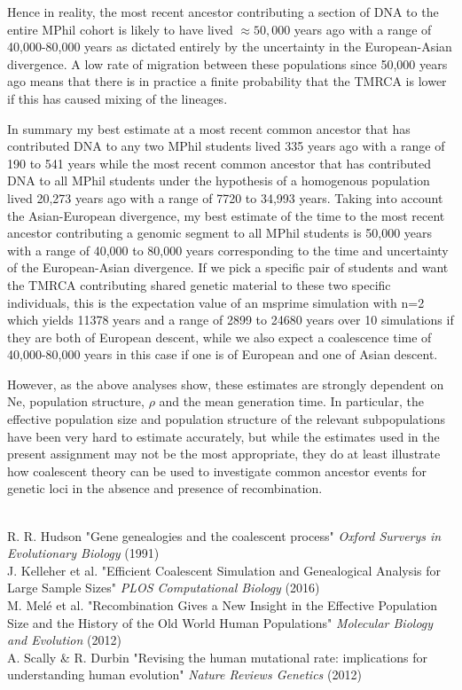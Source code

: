 \documentclass{article}
\begin{document}
Hence in reality, the most recent ancestor contributing a section of DNA to the entire MPhil cohort is likely to have lived $\approx 50,000$ years ago with a range of 40,000-80,000 years as dictated entirely by the uncertainty in the European-Asian divergence. A low rate of migration between these populations since 50,000 years ago means that there is in practice a finite probability that the TMRCA is lower if this has caused mixing of the lineages.

In summary my best estimate at a most recent common ancestor that has contributed DNA to any two MPhil students lived 335 years ago with a range of 190 to 541 years while the most recent common ancestor that has contributed DNA to all MPhil students under the hypothesis of a homogenous population lived 20,273 years ago with a range of 7720 to 34,993 years. Taking into account the Asian-European divergence, my best estimate of the time to the most recent ancestor contributing a genomic segment to all MPhil students is 50,000 years with a range of 40,000 to 80,000 years corresponding to the time and uncertainty of the European-Asian divergence. If we pick a specific pair of students and want the TMRCA contributing shared genetic material to these two specific individuals, this is the expectation value of an msprime simulation with n=2 which yields 11378 years and a range of 2899 to 24680 years over 10 simulations if they are both of European descent, while we also expect a coalescence time of 40,000-80,000 years in this case if one is of European and one of Asian descent.


However, as the above analyses show, these estimates are strongly dependent on Ne, population structure, $\rho$ and the mean generation time. In particular, the effective population size and population structure of the relevant subpopulations have been very hard to estimate accurately, but while the estimates used in the present assignment may not be the most appropriate, they do at least illustrate how coalescent theory can be used to investigate common ancestor events for genetic loci in the absence and presence of recombination.

~\\

R. R. Hudson "Gene genealogies and the coalescent process" \textit{Oxford Surverys in Evolutionary Biology} (1991)\\
J. Kelleher et al. "Efficient Coalescent Simulation and Genealogical Analysis for Large Sample Sizes" \textit{PLOS Computational Biology} (2016)\\
M. Melé et al. "Recombination Gives a New Insight in the Effective Population Size and the History of the Old World Human Populations" \textit{Molecular Biology and Evolution} (2012)\\
A. Scally \& R. Durbin "Revising the human mutational rate: implications for understanding human evolution"  \textit{Nature Reviews Genetics} (2012)\\
\end{document}
